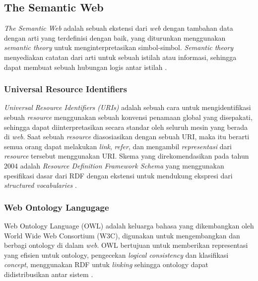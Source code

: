 \subsection{The Semantic Web}
\label{subsec:the-semantic-web}

\textit{The Semantic Web} adalah sebuah ekstensi dari \textit{web} dengan tambahan data dengan arti yang terdefinisi dengan baik, yang diturunkan menggunakan \textit{semantic theory} untuk menginterpretasikan simbol-simbol. \textit{Semantic theory} menyediakan catatan dari arti untuk sebuah istilah atau informasi, sehingga dapat membuat sebuah hubungan logis antar istilah \parencite{shadbolt2006semantic}.

\subsubsection{Universal Resource Identifiers}
\label{subsubsec:universal-resource-identifiers}

\textit{Universal Resource Identifiers (URIs)} adalah sebuah cara untuk mengidentifikasi sebuah \textit{resource} menggunakan sebuah konvensi penamaan global yang disepakati, sehingga dapat diinterpretasikan secara standar oleh seluruh mesin yang berada di \textit{web}. Saat sebuah \textit{resource} diasosiasikan dengan sebuah URI, maka itu berarti semua orang dapat melakukan \textit{link}, \textit{refer}, dan mengambil \textit{representasi} dari \textit{resource} tersebut menggunakan URI. Skema yang direkomendasikan pada tahun 2004 adalah \textit{Resource Definition Framework Schema} yang menggunakan spesifikasi dasar dari RDF dengan ekstensi untuk mendukung ekspresi dari \textit{structured vocabularies} \parencite{shadbolt2006semantic}.

\subsubsection{Web Ontology Langugage}
\label{subsubsec:web-ontology-language}

Web Ontology Language (OWL) adalah keluarga bahasa yang dikembangkan oleh World Wide Web Consortium (W3C), digunakan untuk mengembangkan dan berbagi ontology di dalam \textit{web}. OWL bertujuan untuk memberikan representasi yang efisien untuk ontology, pengecekan \textit{logical consistency} dan klasifikasi \textit{concept}, menggunakan RDF untuk \textit{linking} sehingga ontology dapat didistribusikan antar sistem \parencite{shadbolt2006semantic}.